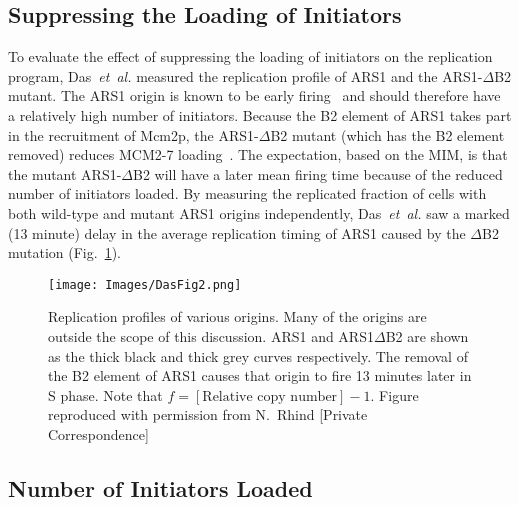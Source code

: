 {		
		\subsection{Suppressing the Loading of Initiators}
		\label{subsec:SuppressingInitiators}
		
		To evaluate the effect of suppressing the loading of initiators on the replication program, Das~\emph{et~al.} measured the replication profile of ARS1 and the ARS1-$\Delta$B2 mutant.
		The ARS1 origin is known to be early firing~\cite{OriDB} and should therefore have a relatively high number of initiators.
		Because the B2 element of ARS1 takes part in the recruitment of Mcm2p, the ARS1-$\Delta$B2 mutant (which has the B2 element removed) reduces MCM2-7 loading~\cite{ARS1Mutant}.
		The expectation, based on the MIM, is that the mutant ARS1-$\Delta$B2 will have a later mean firing time because of the reduced number of initiators loaded.
		By measuring the replicated fraction of cells with both wild-type and mutant ARS1 origins independently, Das~\emph{et~al.} saw a marked (13 minute) delay in the average replication timing of ARS1 caused by the $\Delta$B2 mutation (Fig.~\ref{fig:Das2}).
		
		\begin{figure}[tbh]
			\begin{center}
				\texttt{[image: Images/DasFig2.png]}
			\end{center}
				\caption[Replication profile of various origins]{\label{fig:Das2} Replication profiles of various origins.
					Many of the origins are outside the scope of this discussion.
					ARS1 and ARS1$\Delta$B2 are shown as the thick black and thick grey curves respectively.
					The removal of the B2 element of ARS1 causes that origin to fire 13 minutes later in S phase.
					Note that $f = [\text{Relative copy number}] - 1$.
					Figure reproduced with permission from N.~Rhind [Private Correspondence]~\cite{Rhind}}
		\end{figure}
		
		
		\subsection{Number of Initiators Loaded}
		\label{subsec:NoInitiatorsLoaded}
		
}

